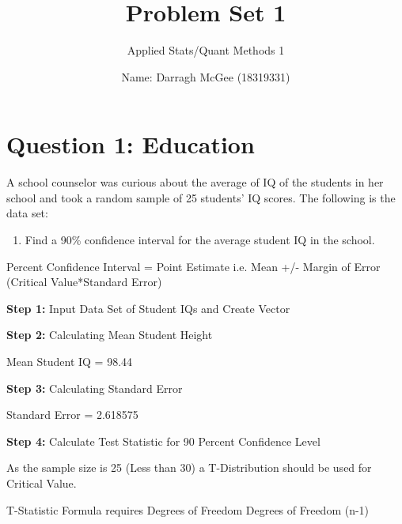 \documentclass[12pt,letterpaper]{article}
\title{Problem Set 1}
\date{
	Name: Darragh McGee (18319331)\\
}
\author{Applied Stats/Quant Methods 1}
\begin{document}
	\maketitle

	\section*{Question 1: Education}

A school counselor was curious about the average of IQ of the students in her school and took a random sample of 25 students' IQ scores. The following is the data set:\\
\vspace{.5cm}
  
\vspace{.5cm}

\begin{enumerate}
\item Find a 90\% confidence interval for the average student IQ in the school.
\end{enumerate}

 Percent Confidence Interval = Point Estimate i.e. Mean +/- Margin of Error (Critical Value*Standard Error)

\vspace{.5cm}
\noindent\textbf{Step 1:} Input Data Set of Student IQs and Create Vector
 

\vspace{.5cm}
\noindent\textbf{Step 2:} Calculating Mean Student Height
 
Mean Student IQ =  98.44

\vspace{.5cm}
\noindent\textbf{Step 3:} Calculating Standard Error
 
Standard Error = 2.618575

\vspace{.5cm}
\noindent\textbf{Step 4:} Calculate Test Statistic for 90 Percent Confidence Level

\noindent As the sample size is 25 (Less than 30) a T-Distribution should be used for Critical Value.  

\vspace{.5cm}
\noindent T-Statistic Formula requires Degrees of Freedom Degrees of Freedom (n-1)
 
\end{document}
